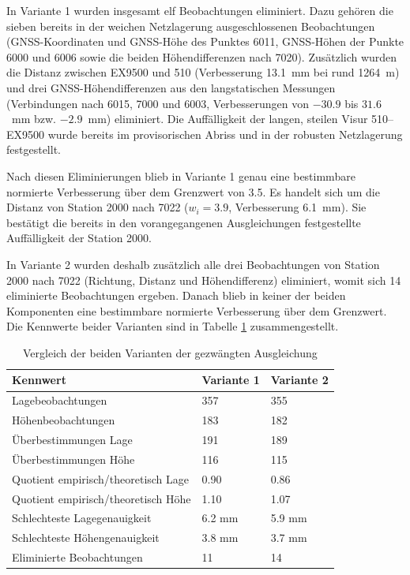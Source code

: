 In Variante 1 wurden insgesamt elf Beobachtungen eliminiert. Dazu gehören die sieben bereits in
der weichen Netzlagerung ausgeschlossenen Beobachtungen (GNSS-Koordinaten und GNSS-Höhe des
Punktes 6011, GNSS-Höhen der Punkte 6000 und 6006 sowie die beiden Höhendifferenzen nach 7020).
Zusätzlich wurden die Distanz zwischen EX9500 und 510 (Verbesserung 13.1~mm bei rund 1264~m) und
drei GNSS-Höhendifferenzen aus den langstatischen Messungen (Verbindungen nach 6015, 7000 und
6003, Verbesserungen von $-30.9$ bis $31.6$~mm bzw. $-2.9$~mm) eliminiert. Die Auffälligkeit der
langen, steilen Visur 510--EX9500 wurde bereits im provisorischen Abriss und in der robusten \bigskip
Netzlagerung festgestellt.

Nach diesen Eliminierungen blieb in Variante 1 genau eine bestimmbare normierte Verbesserung
über dem Grenzwert von 3.5. Es handelt sich um die Distanz von Station 2000 nach 7022
($w_i = 3.9$, Verbesserung 6.1~mm). Sie bestätigt die bereits in den vorangegangenen
Ausgleichungen festgestellte Auffälligkeit der Station 2000.\bigskip

In Variante 2 wurden deshalb zusätzlich alle drei Beobachtungen von Station 2000 nach 7022
(Richtung, Distanz und Höhendifferenz) eliminiert, womit sich 14 eliminierte Beobachtungen
ergeben. Danach blieb in keiner der beiden Komponenten eine bestimmbare normierte Verbesserung
über dem Grenzwert. Die Kennwerte beider Varianten sind in Tabelle \ref{tab:vergleich-gezwängter-ausgleich}
zusammengestellt.

\begin{table}[H]
    \centering
    \begin{tabularx}{\textwidth}{p{6cm} X X}
        \toprule
        Kennwert & Variante 1 & Variante 2 \\
        \midrule
        Lagebeobachtungen & 357 & 355 \\
        \addlinespace
        Höhenbeobachtungen & 183 & 182 \\
        \addlinespace
        Überbestimmungen Lage & 191 & 189 \\
        \addlinespace
        Überbestimmungen Höhe & 116 & 115 \\
        \addlinespace
        Quotient empirisch/theoretisch Lage & 0.90 & 0.86 \\
        \addlinespace
        Quotient empirisch/theoretisch Höhe & 1.10 & 1.07 \\
        \addlinespace
        Schlechteste Lagegenauigkeit & 6.2 mm & 5.9 mm \\
        \addlinespace
        Schlechteste Höhengenauigkeit & 3.8 mm & 3.7 mm \\
        \addlinespace
        Eliminierte Beobachtungen & 11 & 14 \\
        \bottomrule
    \end{tabularx}
    \caption{Vergleich der beiden Varianten der gezwängten Ausgleichung}
    \label{tab:vergleich-gezwängter-ausgleich}
\end{table}

